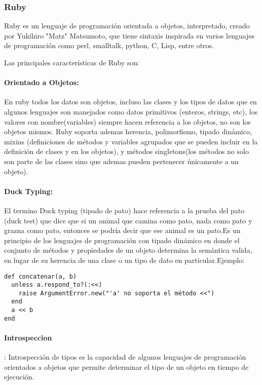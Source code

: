 \subsubsection*{Ruby \cite{ruby_lang} }

Ruby es un lenguaje de programación orientada a objetos, interpretado, creado por Yukihiro "Matz" Matsumoto, que tiene sintaxis inspirada en varios lenguajes de programación como perl, smalltalk, python, C, Lisp, entre otros.

Las principales características de Ruby son:

\paragraph{Orientado a Objetos:}
En ruby todos los datos son objetos, incluso las clases y los tipos de datos que en algunos lenguajes son manejados como datos primitivos (enteros, strings, etc), los valores con nombre(variables) siempre hacen referencia a los objetos, no son los objetos mismos. \newline Ruby soporta ademas herencia, polimorfismo, tipado dinámico, mixins (definiciones de métodos y variables agrupados que se pueden incluir en la definición de clases y en los objetos), y métodos singletons(los métodos no solo son parte de las clases sino que ademas pueden pertenecer únicamente a un objeto).

\paragraph{Duck Typing:}
El termino Duck typing (tipado de pato) hace referencia a la prueba del pato (duck test) que dice que si un animal que camina como pato, nada como pato y grazna como pato, entonces se podría decir que ese animal es un pato.\newline Es un principio de los lenguajes de programación con tipado dinámico en donde el conjunto de métodos y propiedades de un objeto determina la semántica valida, en lugar de su herencia de una clase o un tipo de dato en particular.\newline Ejemplo:

\begin{verbatim}
def concatenar(a, b)
  unless a.respond_to?(:<<)
    raise ArgumentError.new("'a' no soporta el método <<")
  end
  a << b
end
\end{verbatim}

\paragraph{Introspeccion}:
Introspección de tipos es la capacidad de algunos lenguajes de programación orientados a objetos que permite determinar el tipo de un objeto en tiempo de ejecución.

